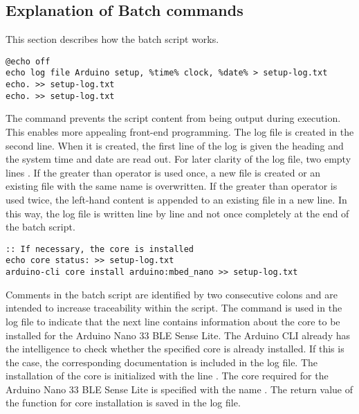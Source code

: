 \subsection{Explanation of Batch commands}

This section describes how the batch script works.

{\small 
    \begin{lstlisting}
@echo off
echo log file Arduino setup, %time% clock, %date% > setup-log.txt
echo. >> setup-log.txt
echo. >> setup-log.txt
    \end{lstlisting}
}

The command  prevents the script content from being output during execution. This enables more appealing front-end programming. The log file is created in the second line. When it is created, the first line of the log is given the heading  and the system time  and date  are read out. For later clarity of the log file, two empty lines . If the greater than operator  is used once, a new file is created or an existing file with the same name is overwritten. If the greater than operator  is used twice, the left-hand content is appended to an existing file in a new line. In this way, the log file is written line by line and not once completely at the end of the batch script.

\begin{center}
    \begin{lstlisting}
:: If necessary, the core is installed
echo core status: >> setup-log.txt
arduino-cli core install arduino:mbed_nano >> setup-log.txt
    \end{lstlisting}
\end{center}

Comments in the batch script are identified by two consecutive colons  and are intended to increase traceability within the script. The command  is used in the log file to indicate that the next line contains information about the core to be installed for the Arduino Nano 33 BLE Sense Lite. The Arduino CLI already has the intelligence to check whether the specified core is already installed. If this is the case, the corresponding documentation is included in the log file. The installation of the core is initialized with the line . The core required for the Arduino Nano 33 BLE Sense Lite is specified with the name . The return value of the function for core installation is saved in the log file.


